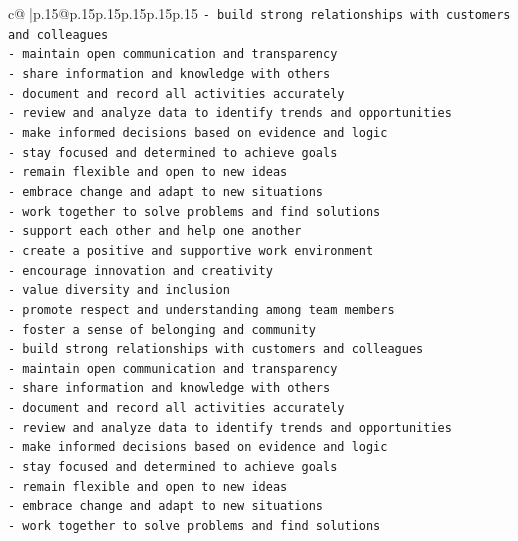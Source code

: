 \documentclass{article}
\begin{document}
{\begin{supertabular}{c@{$\;$}|p{.15\linewidth}@{}p{.15\linewidth}p{.15\linewidth}p{.15\linewidth}p{.15\linewidth}p{.15\linewidth}}
{{{\texttt{{-} build strong relationships with customers and colleagues} \\
\texttt{{-} maintain open communication and transparency} \\
\texttt{{-} share information and knowledge with others} \\
\texttt{{-} document and record all activities accurately} \\
\texttt{{-} review and analyze data to identify trends and opportunities} \\
\texttt{{-} make informed decisions based on evidence and logic} \\
\texttt{{-} stay focused and determined to achieve goals} \\
\texttt{{-} remain flexible and open to new ideas} \\
\texttt{{-} embrace change and adapt to new situations} \\
\texttt{{-} work together to solve problems and find solutions} \\
\texttt{{-} support each other and help one another} \\
\texttt{{-} create a positive and supportive work environment} \\
\texttt{{-} encourage innovation and creativity} \\
\texttt{{-} value diversity and inclusion} \\
\texttt{{-} promote respect and understanding among team members} \\
\texttt{{-} foster a sense of belonging and community} \\
\texttt{{-} build strong relationships with customers and colleagues} \\
\texttt{{-} maintain open communication and transparency} \\
\texttt{{-} share information and knowledge with others} \\
\texttt{{-} document and record all activities accurately} \\
\texttt{{-} review and analyze data to identify trends and opportunities} \\
\texttt{{-} make informed decisions based on evidence and logic} \\
\texttt{{-} stay focused and determined to achieve goals} \\
\texttt{{-} remain flexible and open to new ideas} \\
\texttt{{-} embrace change and adapt to new situations} \\
\texttt{{-} work together to solve problems and find solutions} \\
}}}
\end{supertabular}}
\end{document}
